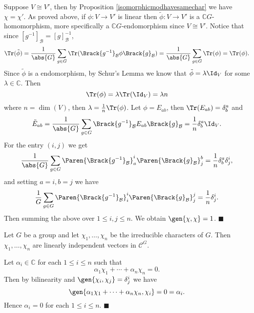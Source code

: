 \documentclass[../Project.tex]{subfiles}
\begin{document}
\begin{proo*}[{\cite[page 28]{3}}]
\begin{menum}
		\item Suppose $V \cong V'$, then by Proposition \ref{isomorphicmodhavesamechar} we have $\chi = \chi'$. As proved above, if $\phi : V \to V'$ is linear then $\tilde{\phi} : V \to V'$ is a $\mathbb{C}G$-homomorphism, more specifically a $\mathbb{C}G$-endomorphism since $V \cong V'$. Notice that since $[g^{-1}]_\mathcal{B} = [g]^{-1}_\mathcal{B}$,
		$$\Tr(\tilde\phi) = \frac{1}{\abs{G}}\sum_{g \in G}\Tr(\Brack{g^{-1}}_{\mathcal{B}}\phi\Brack{g}_\mathcal{B}) = \frac{1}{\abs{G}}\sum_{g \in G}\Tr(\phi) = \Tr(\phi).$$
		Since $\tilde\phi$ is a endomorphism, by Schur's Lemma we know that $\tilde\phi = \lambda\Id_V$ for some $\lambda \in \mathbb{C}$. Then 
		$$\Tr(\phi) = \lambda\Tr(\Id_V) = \lambda n$$
		where $n = \dim(V)$, then $\lambda = \frac{1}{n}\Tr(\phi)$. Let $\phi = E_{ab}$, then $\Tr(E_{ab}) = \delta^a_b$ and
		$$\tilde E_{ab} = \frac{1}{\abs{G}}\sum_{g \in G}\Brack{g^{-1}}_{\mathcal{B}}E_{ab}\Brack{g}_\mathcal{B} = \frac{1}{n}\delta^a_b\Id_V.$$
		For the entry $(i,j)$ we get
		$$\frac{1}{\abs{G}}\sum_{g \in G}\Paren{\Brack{g^{-1}}_\mathcal{B}}^i_a\Paren{\Brack{g}_\mathcal{B}}^b_j = \frac{1}{n}\delta^a_b\delta^i_j,$$
		and setting $a = i, b = j$ we have
		$$\frac{1}{G}\sum_{g \in G}\Paren{\Brack{g^{-1}}_\mathcal{B}}^i_i\Paren{\Brack{g}_\mathcal{B}}
		^j_j = \frac{1}{n}\delta^i_j.$$
		Then summing the above over $1 \leqslant i,j \leqslant n$.
		We obtain $\gen{\chi,\chi} = 1$. \hfill$\blacksquare$\\
	\end{menum}
\end{proo*}

\begin{theo}[{\cite[Theorem 14.23]{2}}]
	Let $G$ be a group and let $\chi_1,\dots,\chi_n$ be the irreducible characters of $G$. Then $\chi_1,\dots,\chi_n$ are linearly independent vectors in $\mathcal{C}^G$.
	\label{linindchar}
\end{theo}
\begin{proo*}[{\cite[Theorem 14.23]{2}}]
	Let $\alpha_i \in \mathbb{C}$ for each $1 \leqslant i \leqslant n$ such that
	$$\alpha_1\chi_1 + \cdots + \alpha_n\chi_n = 0.$$
	Then by bilinearity and $\gen{\chi_i,\chi_j} = \delta^i_j$ we have
	$$\gen{\alpha_1\chi_1 +\cdots + \alpha_n\chi_n,\chi_i} = 0 = \alpha_i.$$
	Hence $\alpha_i = 0$ for each $1 \leqslant i \leqslant n$. \hfill$\blacksquare$\\
\end{proo*}
\end{document}
